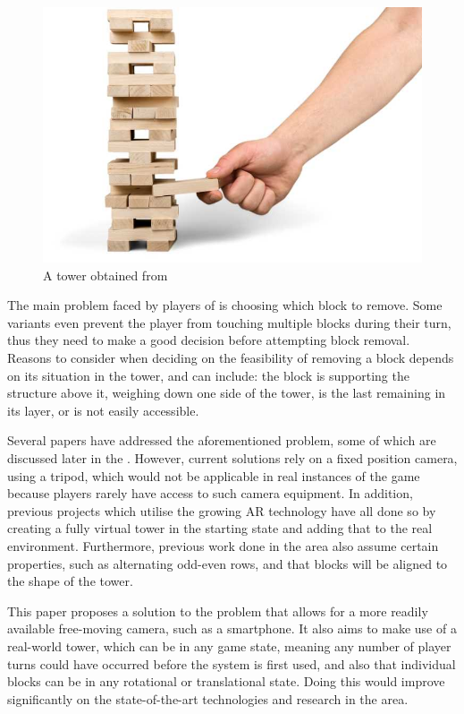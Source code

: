 \begin{figure}[ht]
\begin{minipage}{\textwidth}
    \centering
    \includegraphics[width=0.5\linewidth]{images/proposal/jenga.jpeg}
    \caption{A \jenga{} tower obtained from \protect{}}
    \label{fig:jenga}
\end{minipage}
\end{figure}

The main problem faced by players of \jenga{} is choosing which block to remove. Some variants even prevent the player from touching multiple blocks during their turn, thus they need to make a good decision before attempting block removal. Reasons to consider when deciding on the feasibility of removing a block depends on its situation in the tower, and can include: the block is supporting the structure above it, weighing down one side of the tower, is the last remaining in its layer, or is not easily accessible.

Several papers have addressed the aforementioned problem, some of which are discussed later in the . However, current solutions rely on a fixed position camera, using a tripod, which would not be applicable in real instances of the game because players rarely have access to such camera equipment. In addition, previous projects which utilise the growing AR technology have all done so by creating a fully virtual tower in the starting state and adding that to the real environment. Furthermore, previous work done in the area also assume certain properties, such as alternating odd-even rows, and that blocks will be aligned to the shape of the tower.

This paper proposes a solution to the problem that allows for a more readily available free-moving camera, such as a smartphone. It also aims to make use of a real-world \jenga{} tower, which can be in any game state, meaning any number of player turns could have occurred before the system is first used, and also that individual blocks can be in any rotational or translational state. Doing this would improve significantly on the state-of-the-art technologies and research in the area.

